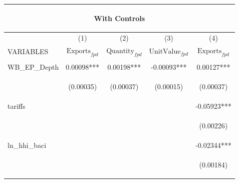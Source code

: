 \documentclass[]{article}
\begin{document}
\begin{center}
\begin{tabular}{lcccc}
\multicolumn{5}{c}{\begin{large}With Controls\end{large}} \\ \hline
 & (1) & (2) & (3) & (4) \\
VARIABLES & $\text{Exports}_{fpd}$ & $\text{Quantity}_{fpd}$ & $\text{UnitValue}_{fpd}$ & $\text{Exports}_{fpd}$ \\ \hline
\vspace{4pt} & \begin{footnotesize}\end{footnotesize} & \begin{footnotesize}\end{footnotesize} & \begin{footnotesize}\end{footnotesize} & \begin{footnotesize}\end{footnotesize} \\
WB\_EP\_Depth & 0.00098*** & 0.00198*** & -0.00093*** & 0.00127*** \\
\vspace{4pt} & \begin{footnotesize}(0.00035)\end{footnotesize} & \begin{footnotesize}(0.00037)\end{footnotesize} & \begin{footnotesize}(0.00015)\end{footnotesize} & \begin{footnotesize}(0.00037)\end{footnotesize} \\
tariffs &  &  &  & -0.05923*** \\
\vspace{4pt} & \begin{footnotesize}\end{footnotesize} & \begin{footnotesize}\end{footnotesize} & \begin{footnotesize}\end{footnotesize} & \begin{footnotesize}(0.00226)\end{footnotesize} \\
ln\_hhi\_baci &  &  &  & -0.02344*** \\
\vspace{4pt} & \begin{footnotesize}\end{footnotesize} & \begin{footnotesize}\end{footnotesize} & \begin{footnotesize}\end{footnotesize} & \begin{footnotesize}(0.00184)\end{footnotesize} \\

\end{tabular}
\end{center}
\end{document}

